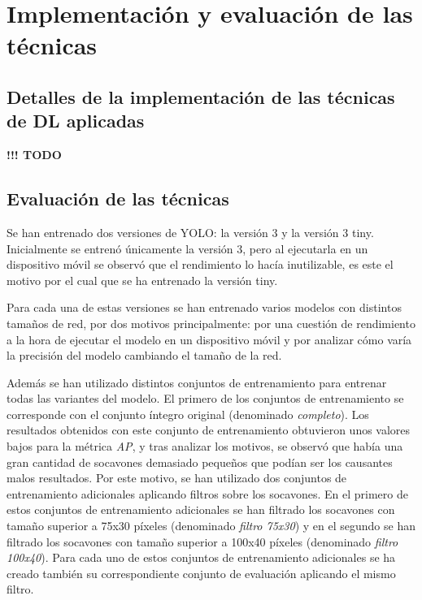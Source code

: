 \section{Implementación y evaluación de las técnicas}


\subsection{Detalles de la implementación de las técnicas de DL aplicadas}


{\color{red} \textbf{!!! TODO}}

\subsection{Evaluación de las técnicas}

Se han entrenado dos versiones de YOLO: la versión 3 y la versión 3 tiny. Inicialmente se entrenó únicamente la versión 3, pero al ejecutarla en un dispositivo móvil se observó que el rendimiento lo hacía inutilizable, es este el motivo por el cual que se ha entrenado la versión tiny.

Para cada una de estas versiones se han entrenado varios modelos con distintos tamaños de red, por dos motivos principalmente: por una cuestión de rendimiento a la hora de ejecutar el modelo en un dispositivo móvil y por analizar cómo varía la precisión del modelo cambiando el tamaño de la red.

Además se han utilizado distintos conjuntos de entrenamiento para entrenar todas las variantes del modelo. El primero de los conjuntos de entrenamiento se corresponde con el conjunto íntegro original (denominado \textit{completo}). Los resultados obtenidos con este conjunto de entrenamiento obtuvieron unos valores bajos para la métrica \textit{AP}, y tras analizar los motivos, se observó que había una gran cantidad de socavones demasiado pequeños que podían ser los causantes malos resultados. Por este motivo, se han utilizado dos conjuntos de entrenamiento adicionales aplicando filtros sobre los socavones. En el primero de estos conjuntos de entrenamiento adicionales se han filtrado los socavones con tamaño superior a 75x30 píxeles (denominado \textit{filtro 75x30}) y en el segundo se han filtrado los socavones con tamaño superior a 100x40 píxeles (denominado \textit{filtro 100x40}). Para cada uno de estos conjuntos de entrenamiento adicionales se ha creado también su correspondiente conjunto de evaluación aplicando el mismo filtro.

